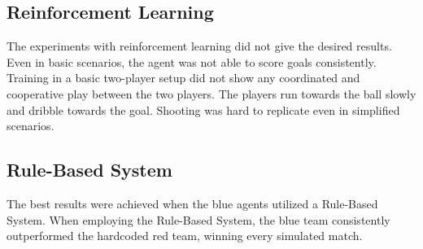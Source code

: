 \subsection{Reinforcement Learning}
The experiments with reinforcement learning did not give the desired results.  
Even in basic scenarios, the agent was not able to score goals consistently.  
Training in a basic two-player setup did not show any coordinated and cooperative play between the two players.  
The players run towards the ball slowly and dribble towards the goal.  
Shooting was hard to replicate even in simplified scenarios.  

\subsection{Rule-Based System}
The best results were achieved when the blue agents utilized a Rule-Based System. When employing the Rule-Based System, 
the blue team consistently outperformed the hardcoded red team, winning every simulated match.
